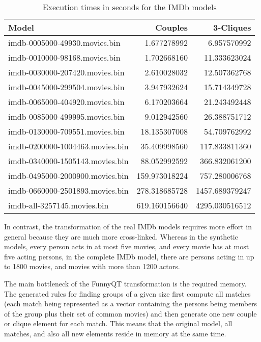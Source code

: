 \documentclass[a4paper]{article}
\begin{document}
\begin{table}
  \centering
  \begin{tabular}{| l | r | r |}
    \hline
    \textbf{Model}                  & \textbf{Couples} & \textbf{3-Cliques}\\
    \hline
    imdb-0005000-49930.movies.bin   &   1.677278992    &        6.957570992\\
    imdb-0010000-98168.movies.bin   &   1.702668160    &        11.333623024\\
    imdb-0030000-207420.movies.bin  &   2.610028032    &        12.507362768\\
    imdb-0045000-299504.movies.bin  &   3.947932624    &        15.714349728\\
    imdb-0065000-404920.movies.bin  &   6.170203664    &        21.243492448\\
    imdb-0085000-499995.movies.bin  &   9.012942560    &        26.388751712\\
    imdb-0130000-709551.movies.bin  &   18.135307008   &        54.709762992\\
    imdb-0200000-1004463.movies.bin &   35.409998560   &        117.833811360\\
    imdb-0340000-1505143.movies.bin &   88.052992592   &        366.832061200\\
    imdb-0495000-2000900.movies.bin &   159.973018224  &        757.280006768\\
    imdb-0660000-2501893.movies.bin &   278.318685728  &        1457.689379247\\
    imdb-all-3257145.movies.bin     &   619.160156640  &        4295.030516512\\
    \hline
  \end{tabular}
  \caption{Execution times in seconds for the IMDb models}
  \label{tab:bench-imdb}
\end{table}

In contrast, the transformation of the real IMDb models requires more effort in
general because they are much more cross-linked.  Whereas in the synthetic
models, every person acts in at most five movies, and every movie has at most
five acting persons, in the complete IMDb model, there are persons acting in up
to 1800 movies, and movies with more than 1200 actors.

The main bottleneck of the FunnyQT transformation is the required memory.  The
generated rules for finding groups of a given size first compute all matches
(each match being represented as a vector containing the persons being members
of the group plus their set of common movies) and then generate one new couple
or clique element for each match.  This means that the original model, all
matches, and also all new elements reside in memory at the same time.
\end{document}
